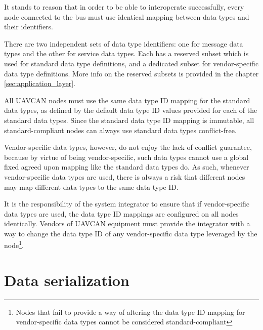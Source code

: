 It stands to reason that in order to be able to interoperate successfully,
every node connected to the bus must use identical mapping between data types and their identifiers.

There are two independent sets of data type identifiers:
one for message data types and the other for service data types.
Each has a reserved subset which is used for standard data type definitions,
and a dedicated subset for vendor-specific data type definitions.
More info on the reserved subsets is provided in the chapter \ref{sec:application_layer}.

All UAVCAN nodes must use the same data type ID mapping for the standard data types,
as defined by the default data type ID values provided for each of the standard data types.
Since the standard data type ID mapping is immutable, all standard-compliant nodes can always
use standard data types conflict-free.

Vendor-specific data types, however, do not enjoy the lack of conflict guarantee,
because by virtue of being vendor-specific, such data types cannot use a global
fixed agreed upon mapping like the standard data types do.
As such, whenever vendor-specific data types are used, there is always a risk that
different nodes may map different data types to the same data type ID.

It is the responsibility of the system integrator to ensure that if vendor-specific data types are
used, the data type ID mappings are configured on all nodes identically.
Vendors of UAVCAN equipment must provide the integrator with a way to change the data type ID
of any vendor-specific data type leveraged by the node\footnote{Nodes that fail to provide a way of
altering the data type ID mapping for vendor-specific data types cannot be considered standard-compliant}.

\section{Data serialization}\label{sec:dsdl_data_serialization}
